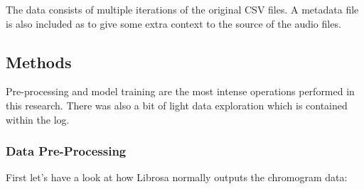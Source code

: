 \documentclass[
]{article}
\begin{document}
The data consists of multiple iterations of the original CSV files. A
metadata file is also included as to give some extra context to the
source of the audio files.

\newpage

\hypertarget{methods}{%
\subsection{Methods}\label{methods}}

Pre-processing and model training are the most intense operations
performed in this research. There was also a bit of light data
exploration which is contained within the log.

\hypertarget{data-pre-processing}{%
\subsubsection{Data Pre-Processing}\label{data-pre-processing}}

First let's have a look at how Librosa normally outputs the chromogram
data:
\end{document}

